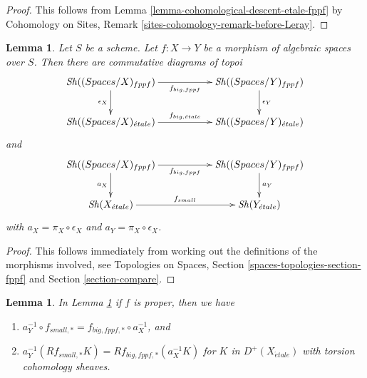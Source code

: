\documentclass{stacks-project}
\theoremstyle{plain}
\newtheorem{lemma}[subsection]{Lemma}
\theoremstyle{definition}
\theoremstyle{remark}
\numberwithin{equation}{subsection}
\def\Sh{\mathop{\mathit{Sh}}\nolimits}
\def\etale{{\acute{e}tale}}
\begin{document}
\begin{proof}
This follows from Lemma \ref{lemma-cohomological-descent-etale-fppf}
by Cohomology on Sites, Remark \ref{sites-cohomology-remark-before-Leray}.
\end{proof}

\begin{lemma}
\label{lemma-push-pull-fppf-etale}
Let $S$ be a scheme.
Let $f : X \to Y$ be a morphism of algebraic spaces over $S$.
Then there are commutative diagrams of topoi
$$
\xymatrix{
\Sh((\textit{Spaces}/X)_{fppf}) \ar[rr]_{f_{big, fppf}} \ar[d]_{\epsilon_X} & &
\Sh((\textit{Spaces}/Y)_{fppf}) \ar[d]^{\epsilon_Y} \\
\Sh((\textit{Spaces}/X)_\etale) \ar[rr]^{f_{big, \etale}} & &
\Sh((\textit{Spaces}/Y)_\etale)
}
$$
and
$$
\xymatrix{
\Sh((\textit{Spaces}/X)_{fppf}) \ar[rr]_{f_{big, fppf}} \ar[d]_{a_X} & &
\Sh((\textit{Spaces}/Y)_{fppf}) \ar[d]^{a_Y} \\
\Sh(X_\etale) \ar[rr]^{f_{small}} & &
\Sh(Y_\etale)
}
$$
with $a_X = \pi_X \circ \epsilon_X$ and $a_Y = \pi_X \circ \epsilon_X$.
\end{lemma}

\begin{proof}
This follows immediately from working out the definitions of the
morphisms involved, see
Topologies on Spaces, Section \ref{spaces-topologies-section-fppf}
and Section \ref{section-compare}.
\end{proof}

\begin{lemma}
\label{lemma-proper-push-pull-fppf-etale}
In Lemma \ref{lemma-push-pull-fppf-etale} if $f$ is proper, then we have
\begin{enumerate}
\item $a_Y^{-1} \circ f_{small, *} = f_{big, fppf, *} \circ a_X^{-1}$, and
\item
$a_Y^{-1}(Rf_{small, *}K) = Rf_{big, fppf, *}(a_X^{-1}K)$
for $K$ in $D^+(X_\etale)$ with torsion cohomology sheaves.
\end{enumerate}
\end{lemma}
\end{document}
